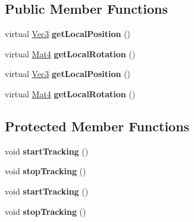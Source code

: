 \subsection*{Public Member Functions}
\begin{DoxyCompactItemize}
\item 
\mbox{\label{classVRGenericHeadTracker_a38ad7a59cd8b71c83c1646ae538da986}} 
virtual \hyperlink{classVec3}{Vec3} {\bfseries get\+Local\+Position} ()
\item 
\mbox{\label{classVRGenericHeadTracker_acf8565d3abbc63484573522c6a7ae5e6}} 
virtual \hyperlink{classMat4}{Mat4} {\bfseries get\+Local\+Rotation} ()
\item 
\mbox{\label{classVRGenericHeadTracker_ab406b017d456fe700a9343099605fdfb}} 
virtual \hyperlink{classVec3}{Vec3} {\bfseries get\+Local\+Position} ()
\item 
\mbox{\label{classVRGenericHeadTracker_a668615abc75dc22d2919d4ffd2b4e829}} 
virtual \hyperlink{classMat4}{Mat4} {\bfseries get\+Local\+Rotation} ()
\end{DoxyCompactItemize}
\subsection*{Protected Member Functions}
\begin{DoxyCompactItemize}
\item 
\mbox{\label{classVRGenericHeadTracker_a32421a85794bb1f1cf0a313b18b720f8}} 
void {\bfseries start\+Tracking} ()
\item 
\mbox{\label{classVRGenericHeadTracker_ae50e9502d56c7212fb721bcf0c2f756f}} 
void {\bfseries stop\+Tracking} ()
\item 
\mbox{\label{classVRGenericHeadTracker_a32421a85794bb1f1cf0a313b18b720f8}} 
void {\bfseries start\+Tracking} ()
\item 
\mbox{\label{classVRGenericHeadTracker_ae50e9502d56c7212fb721bcf0c2f756f}} 
void {\bfseries stop\+Tracking} ()
\end{DoxyCompactItemize}

